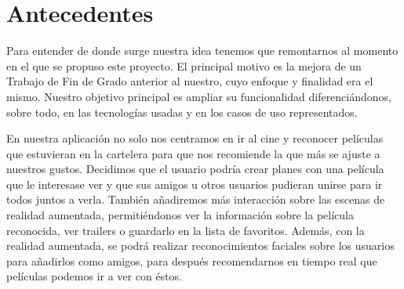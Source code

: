 


\section{Antecedentes}
\label{makereference1.1}

Para entender de donde surge nuestra idea tenemos que remontarnos al momento en el que se propuso este proyecto.
El principal motivo es la mejora de un Trabajo de Fin de Grado anterior
 al nuestro\cite{TFGRA16}, cuyo enfoque y finalidad era el mismo. Nuestro objetivo principal es 
 ampliar su funcionalidad diferenciándonos, sobre todo, en las tecnologías usadas y 
 en los casos de uso representados.

 En nuestra aplicación no solo nos centramos en ir al cine y reconocer películas que estuvieran en la cartelera
 para que nos recomiende la que más se ajuste a nuestros gustos. Decidimos que el usuario podría crear planes con
 una película que le interesase ver y que sus amigos u otros usuarios pudieran unirse para ir todos juntos a verla.
 También añadiremos más interacción sobre las escenas de realidad aumentada, permitiéndonos ver la información sobre la 
 película reconocida, ver trailers o guardarlo en la lista de favoritos. Además, con la realidad aumentada,
 se podrá realizar reconocimientos faciales sobre los usuarios para añadirlos como amigos, para después recomendarnos en tiempo real
 que películas podemos ir a ver con éstos.


